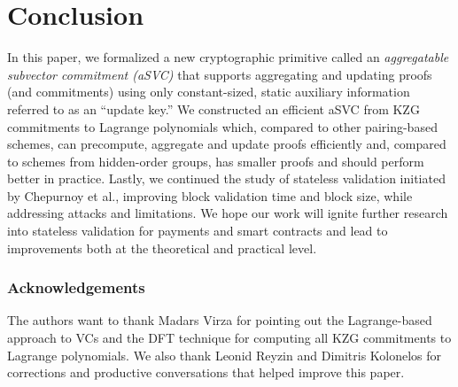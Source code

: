 \section{Conclusion}
In this paper, we formalized a new cryptographic primitive called an \textit{aggregatable subvector commitment (aSVC)} that supports aggregating and updating proofs (and commitments) using only constant-sized, static auxiliary information referred to as an ``update key.''
We constructed an efficient aSVC from KZG commitments to Lagrange polynomials which, compared to other pairing-based schemes, can precompute, aggregate and update proofs efficiently and, compared to schemes from hidden-order groups, has smaller proofs and should perform better in practice.
Lastly, we continued the study of stateless validation initiated by Chepurnoy et al., improving block validation time and block size, while addressing attacks and limitations.
We hope our work will ignite further research into stateless validation for payments and smart contracts and lead to improvements both at the theoretical and practical level.

\subsubsection*{Acknowledgements}
The authors want to thank Madars Virza for pointing out the Lagrange-based approach to VCs and the DFT technique for computing all KZG commitments to Lagrange polynomials.
We also thank Leonid Reyzin and Dimitris Kolonelos for corrections and productive conversations that helped improve this paper.
